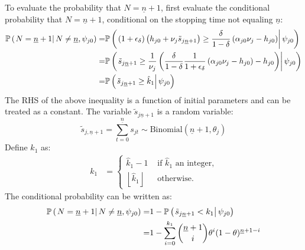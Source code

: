 \documentclass[11 pt]{article}
\newcommand{\pr}[1]{\left( #1 \right)}
\newcommand{\cls}[2]{\left. #1 \right\vert #2}
\newcommand{\floor}[1]{\left\lfloor #1 \right\rfloor}
\newcommand{\pass}{s}
\newcommand{\ddelta}{\left\lceil \frac{\delta}{1 - \delta} \right\rceil}
\newcommand*{\ks}[1][t]{\tilde{\pass}_{j #1}}
\begin{document}
To evaluate the probability that $N = \underline{n} + 1$, first evaluate the conditional probability that $N = \underline{n} + 1$, conditional on the stopping time not equaling $\underline{n}$:
\begin{align*}
    \PP \pr{\cls{N = \underline{n} + 1}{N \neq \underline{n}, \psi_{j0}}}
    =&
    \PP \pr{\cls{
        \pr{1 + \epsilon_\delta}
        \pr{h_{j0} + \nu_j \ks[\underline{n} + 1]}
        \geq
        \frac{\delta}{1 - \delta}
        \pr{\alpha_{j0} \nu_j - h_{j0}}
    }{\psi_{j0}}}
    \\
    =&
    \PP \pr{\cls{
        \ks[\underline{n} + 1]
        \geq
        \frac{1}{\nu_j}
        \pr{        
            \frac{\delta}{1 - \delta} 
            \frac{1}{1 + \epsilon_\delta}
            \pr{\alpha_{j0} \nu_j - h_{j0}}
            - h_{j0}
        }
    }{\psi_{j0}}}
    \\
    =&
    \PP \pr{\cls{
        \ks[\underline{n} + 1]
        \geq
        \hat{k}_1
    }{\psi_{j0}}}
\end{align*}
The RHS of the above inequality is a function of initial parameters and can be treated as a constant.
The variable $\ks[\underline{n} + 1]$ is a random variable:
\begin{equation*}
    \ks[, \underline{n} + 1] = \sum_{t=0}^{\underline{n}} \pass_{jt} \sim \text{Binomial} (\underline{n} + 1, \theta_j)
\end{equation*}
Define $k_1$ as:
\begin{align*}
    k_1 &= \begin{cases}
    \hat{k}_1 - 1
    &\text{ if $\hat{k}_1$ an integer,}
    \\
    \floor{\hat{k}_1}
    &\text{ otherwise.}
    \end{cases}
\end{align*}
The conditional probability can be written as:
\begin{align*}
    \PP \pr{\cls{N = \underline{n} + 1}{N \neq \underline{n}, \psi_{j0}}}
    =&
    1 
    -
    \PP \pr{\cls{
        \ks[\underline{n} + 1]
        <
        k_1
    }{\psi_{j0}}} 
    \\
    =&
    1 
    - 
    \sum_{i=0}^{k_1}
    \binom{\underline{n} + 1}{i}
    \theta^i
    (1 - \theta)^{\underline{n} + 1 - i}
\end{align*}
\end{document}
